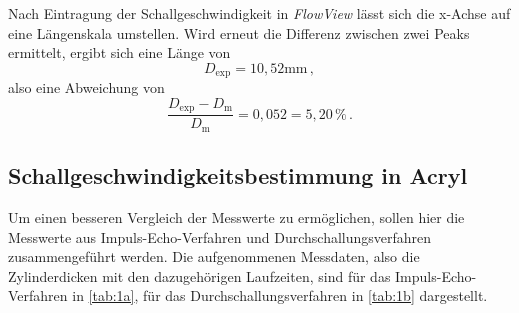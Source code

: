 Nach Eintragung der Schallgeschwindigkeit in \textit{FlowView} lässt sich die x-Achse auf eine Längenskala umstellen.
Wird erneut die Differenz zwischen zwei Peaks ermittelt, ergibt sich eine Länge von
\begin{equation*}
    D_\text{exp} = 10,52 \unit{\milli\meter} \,,
\end{equation*}
also eine Abweichung von
\begin{equation*}
    \frac{D_\text{exp}-D_\text{m}}{D_\text{m}} = 0,052 = 5,20 \,\% \,.
\end{equation*}


\subsection{Schallgeschwindigkeitsbestimmung in Acryl}

Um einen besseren Vergleich der Messwerte zu ermöglichen, sollen hier die Messwerte aus Impuls-Echo-Verfahren und Durchschallungsverfahren zusammengeführt werden.
Die aufgenommenen Messdaten, also die Zylinderdicken mit den dazugehörigen Laufzeiten, sind für das Impuls-Echo-Verfahren in \autoref{tab:1a}, für das Durchschallungsverfahren in \autoref{tab:1b} dargestellt.


